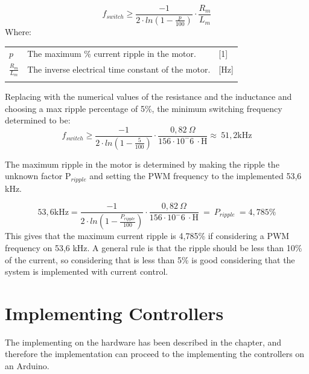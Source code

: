 \begin{equation}
f_{switch} \geq \frac{-1}{2\cdot ln(1-\frac{p}{100})}\cdot\frac{R_{m}}{L_{m}}
\label{eq:PWMSwitch}
\end{equation}
Where:\\
\begin{tabular}{m{8em} m{25em} m{8em}}
$p$& The maximum \% current ripple in the motor. & [1]\\
$\frac{R_{m}}{L_{m}}$& The inverse electrical time constant of the motor.& [Hz]\\
\\
\end{tabular}

Replacing with the numerical values of the resistance and the inductance and choosing a max ripple percentage of 5\%, the minimum switching frequency determined to be:
\begin{equation}
    f_{switch} \geq \frac{-1}{2 \cdot ln(1-\frac{5}{100})}\cdot\frac{0,82\ \Omega}{156\cdot10^-6 \ \cdot \text{H}} \approx \ 51,2 \text{kHz}
\end{equation}

The maximum ripple in the motor is determined by making the ripple the unknown factor P$_{ripple}$ and setting the PWM frequency to the implemented 53,6 kHz.  

\begin{equation}
    53,6 \text{kHz} = \frac{-1}{2 \cdot ln(1-\frac{P_{ripple}}{100})}\cdot\frac{0,82\ \Omega}{156\cdot10^-6 \ \cdot \text{H}}\ =\ P_{ripple}\ = 4,785\%  
\end{equation}
This gives that the maximum current ripple is 4,785\% if considering a PWM frequency on 53,6 kHz. A general rule is that the ripple should be less than 10\% of the current, so considering that is less than 5\% is good considering that the system is implemented with current control.


 
\section{Implementing Controllers}
The implementing on the hardware has been described in the chapter, and therefore the implementation can proceed to the implementing the controllers on an Arduino. 



